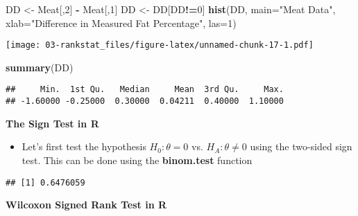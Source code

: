 \documentclass[]{book}
\newenvironment{Shaded}{\begin{snugshade}}{\end{snugshade}}
\newcommand{\DataTypeTok}[1]{\textcolor[rgb]{0.13,0.29,0.53}{#1}}
\newcommand{\DecValTok}[1]{\textcolor[rgb]{0.00,0.00,0.81}{#1}}
\newcommand{\FloatTok}[1]{\textcolor[rgb]{0.00,0.00,0.81}{#1}}
\newcommand{\KeywordTok}[1]{\textcolor[rgb]{0.13,0.29,0.53}{\textbf{#1}}}
\newcommand{\NormalTok}[1]{#1}
\newcommand{\OperatorTok}[1]{\textcolor[rgb]{0.81,0.36,0.00}{\textbf{#1}}}
\newcommand{\StringTok}[1]{\textcolor[rgb]{0.31,0.60,0.02}{#1}}
\providecommand{\tightlist}{%
  \setlength{\itemsep}{0pt}\setlength{\parskip}{0pt}}
\begin{document}
\begin{Shaded}
\begin{Highlighting}[]
\NormalTok{DD <-}\StringTok{ }\NormalTok{Meat[,}\DecValTok{2}\NormalTok{] }\OperatorTok{-}\StringTok{ }\NormalTok{Meat[,}\DecValTok{1}\NormalTok{]}
\NormalTok{DD <-}\StringTok{ }\NormalTok{DD[DD}\OperatorTok{!=}\DecValTok{0}\NormalTok{]}
\KeywordTok{hist}\NormalTok{(DD, }\DataTypeTok{main=}\StringTok{"Meat Data"}\NormalTok{, }\DataTypeTok{xlab=}\StringTok{"Difference in Measured Fat Percentage"}\NormalTok{, }\DataTypeTok{las=}\DecValTok{1}\NormalTok{)}
\end{Highlighting}
\end{Shaded}

\texttt{[image: 03-rankstat\_files/figure-latex/unnamed-chunk-17-1.pdf]}

\begin{Shaded}
\begin{Highlighting}[]
\KeywordTok{summary}\NormalTok{(DD)}
\end{Highlighting}
\end{Shaded}

\begin{verbatim}
##     Min.  1st Qu.   Median     Mean  3rd Qu.     Max. 
## -1.60000 -0.25000  0.30000  0.04211  0.40000  1.10000
\end{verbatim}

\textbf{The Sign Test in R}

\begin{itemize}
\tightlist
\item
  Let's first test the hypothesis \(H_{0}: \theta = 0\) vs. \(H_{A}: \theta \neq 0\) using
  the two-sided sign test. This can be done using the \textbf{binom.test} function
\end{itemize}

\begin{Shaded}
\end{Shaded}

\begin{verbatim}
## [1] 0.6476059
\end{verbatim}

\textbf{Wilcoxon Signed Rank Test in R}
\end{document}

